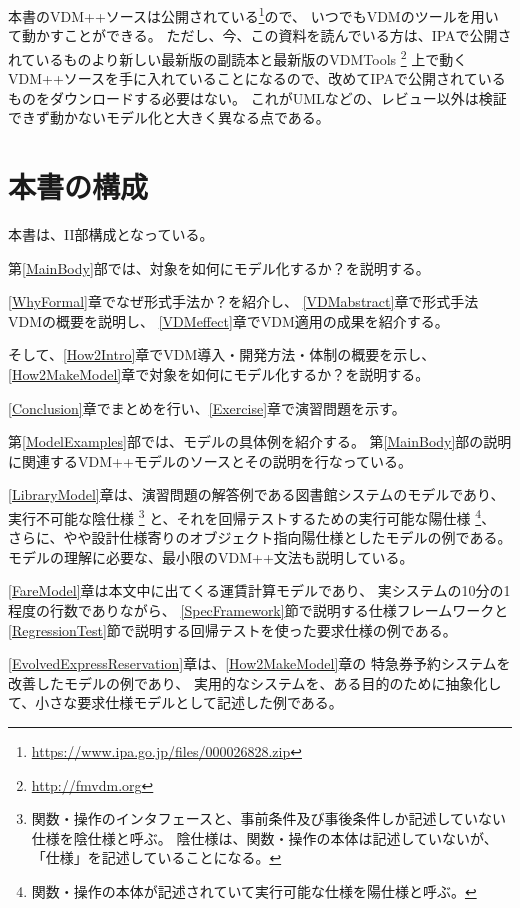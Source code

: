 	本書のVDM++ソースは公開されている\footnote{\url{https://www.ipa.go.jp/files/000026828.zip}}ので、
	いつでもVDMのツールを用いて動かすことができる。
	ただし、今、この資料を読んでいる方は、IPAで公開されているものより新しい最新版の副読本と最新版のVDMTools
	\footnote{\url{http://fmvdm.org}}
	上で動くVDM++ソースを手に入れていることになるので、改めてIPAで公開されているものをダウンロードする必要はない。
	これがUMLなどの、レビュー以外は検証できず動かないモデル化と大きく異なる点である。

\section {本書の構成}

	本書は、I\hspace{-.1em}I部構成となっている。

	第\ref{MainBody}部では、対象を如何にモデル化するか？を説明する。

	\ref{WhyFormal}章でなぜ形式手法か？を紹介し、
	\ref{VDMabstract}章で形式手法VDMの概要を説明し、
	\ref{VDMeffect}章でVDM適用の成果を紹介する。

	そして、\ref{How2Intro}章でVDM導入・開発方法・体制の概要を示し、
	\ref{How2MakeModel}章で対象を如何にモデル化するか？を説明する。

	\ref{Conclusion}章でまとめを行い、\ref{Exercise}章で演習問題を示す。

	第\ref{ModelExamples}部では、モデルの具体例を紹介する。
	第\ref{MainBody}部の説明に関連するVDM++モデルのソースとその説明を行なっている。

	\ref{LibraryModel}章は、演習問題の解答例である図書館システムのモデルであり、
	実行不可能な陰仕様
		\footnote{関数・操作のインタフェースと、事前条件及び事後条件しか記述していない仕様を陰仕様と呼ぶ。
		陰仕様は、関数・操作の本体は記述していないが、「仕様」を記述していることになる。}
	と、それを回帰テストするための実行可能な陽仕様
		\footnote{関数・操作の本体が記述されていて実行可能な仕様を陽仕様と呼ぶ。}、
	さらに、やや設計仕様寄りのオブジェクト指向陽仕様としたモデルの例である。
	モデルの理解に必要な、最小限のVDM++文法も説明している。

	\ref{FareModel}章は本文中に出てくる運賃計算モデルであり、
	実システムの10分の1程度の行数でありながら、
	\ref{SpecFramework}節で説明する仕様フレームワークと
	\ref{RegressionTest}節で説明する回帰テストを使った要求仕様の例である。

	\ref{EvolvedExpressReservation}章は、\ref{How2MakeModel}章の
	特急券予約システムを改善したモデルの例であり、
	実用的なシステムを、ある目的のために抽象化して、小さな要求仕様モデルとして記述した例である。